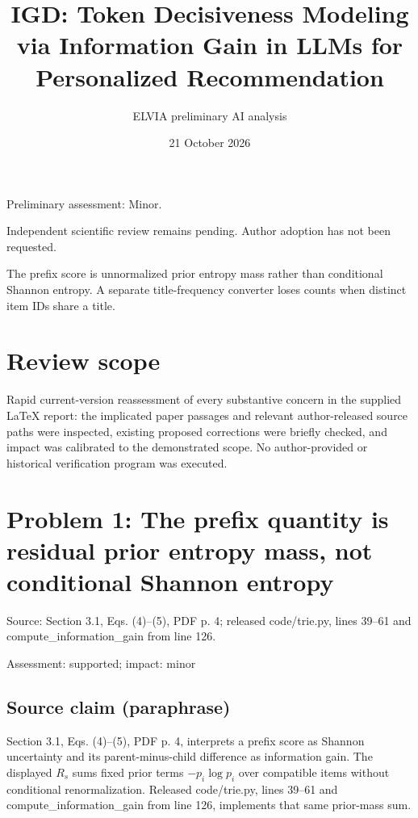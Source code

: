 \documentclass[11pt]{article}
\begin{document}
\title{IGD: Token Decisiveness Modeling via Information Gain in LLMs for Personalized Recommendation}

\author{ELVIA preliminary AI analysis}\date{21 October 2026}\maketitle

Preliminary assessment: Minor.\par

Independent scientific review remains pending. Author adoption has not been requested.

The prefix score is unnormalized prior entropy mass rather than conditional Shannon entropy. A separate title-frequency converter loses counts when distinct item IDs share a title.

\section*{Review scope}

Rapid current-version reassessment of every substantive concern in the supplied LaTeX report: the implicated paper passages and relevant author-released source paths were inspected, existing proposed corrections were briefly checked, and impact was calibrated to the demonstrated scope. No author-provided or historical verification program was executed.

\section*{Problem 1: The prefix quantity is residual prior entropy mass, not conditional Shannon entropy}

Source: Section 3.1, Eqs. (4)–(5), PDF p. 4; released code/trie.py, lines 39–61 and compute\_information\_gain from line 126.

Assessment: supported; impact: minor

\subsection*{Source claim (paraphrase)}

Section 3.1, Eqs. (4)–(5), PDF p. 4, interprets a prefix score as Shannon uncertainty and its parent-minus-child difference as information gain. The displayed \(R_s\) sums fixed prior terms \(-p_i\log p_i\) over compatible items without conditional renormalization. Released code/trie.py, lines 39–61 and compute\_information\_gain from line 126, implements that same prior-mass sum.
\end{document}
